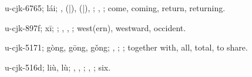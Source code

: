 \begin{multicols}{2}
{\cjkgGlue{}u-cjk-6765; lái; \cjkgGlue{}\cjkgGlue{}\cjkgGlue{}, \cjkgGlue{}\cjkgGlue{}(\cjkgGlue{}|\cjkgGlue{}), \cjkgGlue{}\cjkgGlue{}(\cjkgGlue{}|\cjkgGlue{}), \cjkgGlue{}; \cjkgGlue{}, \cjkgGlue{}; come, coming, return, returning.

\cjkgGlue{}u-cjk-897f; xī; \cjkgGlue{}; \cjkgGlue{}, \cjkgGlue{}, \cjkgGlue{}; west(ern), westward, occident.

\cjkgGlue{}u-cjk-5171; gòng, gōng, gǒng; \cjkgGlue{}\cjkgGlue{}\cjkgGlue{}, \cjkgGlue{}; \cjkgGlue{}; together with, all, total, to share.

\cjkgGlue{}u-cjk-516d; liù, lù; \cjkgGlue{}\cjkgGlue{}\cjkgGlue{}, \cjkgGlue{}\cjkgGlue{}\cjkgGlue{}, \cjkgGlue{}; \cjkgGlue{}, \cjkgGlue{}; six.

}
\end{multicols}
